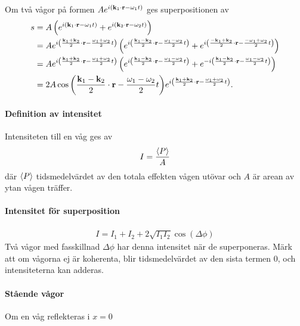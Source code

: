 \deriv
Om två vågor på formen $Ae^{i(\vect{k}_{1}\cdot\vect{r} - \omega_{1} t)}$ ges superpositionen av
\begin{align*}
	s &= A\left(e^{i(\vect{k}_{1}\cdot\vect{r} - \omega_{1} t)} + e^{i(\vect{k}_{2}\cdot\vect{r} - \omega_{2} t)}\right) \\
	  &= Ae^{i\left(\frac{\vect{k}_{1} + \vect{k}_{2}}{2}\cdot\vect{r} - \frac{\omega_{1} + \omega_{2}}{2}t\right)}\left(e^{i\left(\frac{\vect{k}_{1} - \vect{k}_{2}}{2}\cdot\vect{r} - \frac{\omega_{1} - \omega_{2}}{2}t\right)} + e^{i\left(\frac{-\vect{k}_{1} + \vect{k}_{2}}{2}\cdot\vect{r} - \frac{-\omega_{1} + \omega_{2}}{2}t\right)}\right) \\
	  &= Ae^{i\left(\frac{\vect{k}_{1} + \vect{k}_{2}}{2}\cdot\vect{r} - \frac{\omega_{1} + \omega_{2}}{2}t\right)}\left(e^{i\left(\frac{\vect{k}_{1} - \vect{k}_{2}}{2}\cdot\vect{r} - \frac{\omega_{1} - \omega_{2}}{2}t\right)} + e^{-i\left(\frac{\vect{k}_{1} - \vect{k}_{2}}{2}\cdot\vect{r} - \frac{\omega_{1} - \omega_{2}}{2}t\right)}\right) \\
	  &= 2A\cos{\left(\frac{\vect{k}_{1} - \vect{k}_{2}}{2}\cdot\vect{r} - \frac{\omega_{1} - \omega_{2}}{2}t\right)}e^{i\left(\frac{\vect{k}_{1} + \vect{k}_{2}}{2}\cdot\vect{r} - \frac{\omega_{1} + \omega_{2}}{2}t\right)}.
\end{align*}

\paragraph{Definition av intensitet}
Intensiteten till en våg ges av
\begin{align*}
	I = \frac{\expval{P}}{A}
\end{align*}
där $\expval{P}$ tidsmedelvärdet av den totala effekten vågen utövar och $A$ är arean av ytan vågen träffer.

\paragraph{Intensitet för superposition}
\begin{align*}
	I = I_1 + I_2 + 2\sqrt{I_1I_2}\cos{(\Delta\phi)}
\end{align*}
Två vågor med fasskillnad $\Delta\phi$ har denna intensitet när de superponeras. Märk att om vågorna ej är koherenta, blir tidsmedelvärdet av den sista termen $0$, och intensiteterna kan adderas.

\deriv

\paragraph{Stående vågor}
Om en våg reflekteras i $x = 0$

